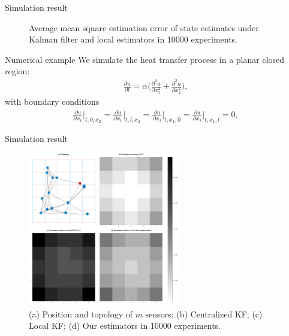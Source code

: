 \documentclass[10pt]{beamer}
\DeclareMathOperator{\1}{\textbf{1}}
\begin{document}
	      \begin{frame}{Simulation result}
		\begin{figure}
		  \centering
		  \scalebox{0.7}{}
		  \scalebox{0.7}{}
		  \caption{Average mean square estimation error of state estimates under Kalman filter and local estimators in 10000 experiments.}
		\end{figure}
	      \end{frame}

	      \begin{frame}{Numerical example}
		We simulate the heat transfer process in a planar closed region:
		\begin{align*}
		  \frac{\partial u}{\partial t}=\alpha\Big(\frac{\partial^2u}{\partial x_1^2}+\frac{\partial^2u}{\partial x_2^2}\Big),
		\end{align*}
		with boundary conditions
		\begin{align*}
		  \frac{\partial u}{\partial x_1}\Big|_{t,0,x_2}=\frac{\partial u}{\partial x_1}\Big|_{t,l,x_2}=\frac{\partial u}{\partial x_2}\Big|_{t,x_1,0}=\frac{\partial u}{\partial x_2}\Big|_{t,x_1,l}=0,
		\end{align*}
	      \end{frame}

	      \begin{frame}{Simulation result}
		\begin{figure}[]
		  \centering
		  \includegraphics[width=0.6\textwidth]{pic/variance.pdf}
		  \caption{(a) Position and topology of $m$ sensors; (b) Centralized KF; (c) Local KF; (d) Our estimators in 10000 experiments.}
		  \label{fig:heatmap}
		\end{figure}
	      \end{frame}
\end{document}
